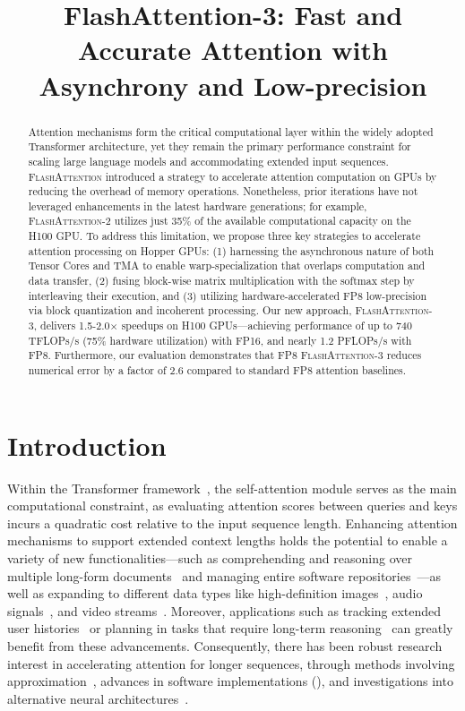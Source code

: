 \title{FlashAttention-3: Fast and Accurate Attention with Asynchrony and Low-precision}

\begin{abstract}
Attention mechanisms form the critical computational layer within the widely adopted Transformer architecture, yet they remain the primary performance constraint for scaling large language models and accommodating extended input sequences. \textsc{FlashAttention} introduced a strategy to accelerate attention computation on GPUs by reducing the overhead of memory operations. Nonetheless, prior iterations have not leveraged enhancements in the latest hardware generations; for example, \textsc{FlashAttention-2} utilizes just 35\% of the available computational capacity on the H100 GPU. To address this limitation, we propose three key strategies to accelerate attention processing on Hopper GPUs: (1) harnessing the asynchronous nature of both Tensor Cores and TMA to enable warp-specialization that overlaps computation and data transfer, (2) fusing block-wise matrix multiplication with the softmax step by interleaving their execution, and (3) utilizing hardware-accelerated FP8 low-precision via block quantization and incoherent processing. Our new approach, \textsc{FlashAttention-3}, delivers 1.5-2.0$\times$ speedups on H100 GPUs—achieving performance of up to 740 TFLOPs/s (75\% hardware utilization) with FP16, and nearly 1.2 PFLOPs/s with FP8. Furthermore, our evaluation demonstrates that FP8 \textsc{FlashAttention-3} reduces numerical error by a factor of 2.6 compared to standard FP8 attention baselines.
\end{abstract}

\section{Introduction}
\label{sec:intro}

Within the Transformer framework~\citep{vaswani2017attention}, the self-attention module serves as the main computational constraint, as evaluating attention scores between queries and keys incurs a quadratic cost relative to the input sequence length. Enhancing attention mechanisms to support extended context lengths holds the potential to enable a variety of new functionalities—such as comprehending and reasoning over multiple long-form documents~\citep{guo2021longt5,shaham2022scrolls,peng2023yarn} and managing entire software repositories~\citep{roziere2023code, li2023starcoder}—as well as expanding to different data types like high-definition images~\citep{chen2022scaling}, audio signals~\citep{gulati2020conformer}, and video streams~\citep{ho2022video}. Moreover, applications such as tracking extended user histories~\citep{sun2019bert4rec} or planning in tasks that require long-term reasoning~\citep{yao2022react} can greatly benefit from these advancements. Consequently, there has been robust research interest in accelerating attention for longer sequences, through methods involving approximation~\citep{katharopoulos2020transformers,choromanski2020rethinking, tay2020efficient}, advances in software implementations (\citep{rabe2021self,dao2022flashattention,kwon2023efficient}), and investigations into alternative neural architectures~\citep{peng2023rwkv,sun2023retentive,gu2023mamba}.

